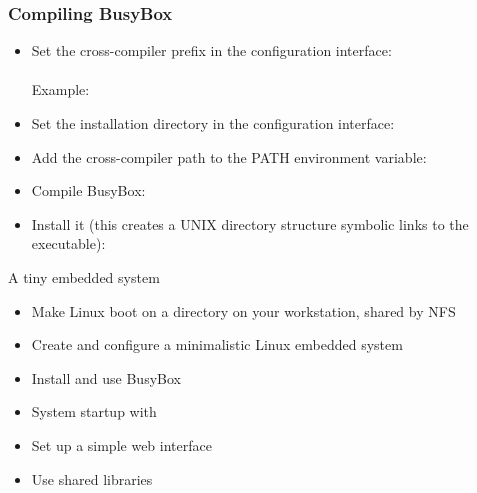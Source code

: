 \begin{frame}
  \frametitle{Compiling BusyBox}
  \begin{itemize}
  \item Set the cross-compiler prefix in the configuration interface: \\
    \\
    Example: 
  \item Set the installation directory in the configuration interface: \\
  \item Add the cross-compiler path to the PATH environment variable:\\
  \item Compile BusyBox:\\
  \item Install it (this creates a UNIX directory structure symbolic
    links to the  executable):\\
  \end{itemize}
\end{frame}

\setuplabframe
{A tiny embedded system}
{
  \begin{itemize}
  \item Make Linux boot on a directory on your workstation, shared by NFS
  \item Create and configure a minimalistic Linux embedded system
  \item Install and use BusyBox
  \item System startup with 
  \item Set up a simple web interface
  \item Use shared libraries
  \end{itemize}
}
